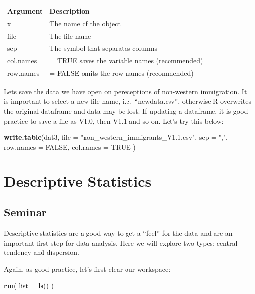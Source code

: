 \documentclass[]{article}
\newenvironment{Shaded}{\begin{snugshade}}{\end{snugshade}}
\newcommand{\DataTypeTok}[1]{\textcolor[rgb]{0.13,0.29,0.53}{#1}}
\newcommand{\KeywordTok}[1]{\textcolor[rgb]{0.13,0.29,0.53}{\textbf{#1}}}
\newcommand{\NormalTok}[1]{#1}
\newcommand{\OtherTok}[1]{\textcolor[rgb]{0.56,0.35,0.01}{#1}}
\newcommand{\StringTok}[1]{\textcolor[rgb]{0.31,0.60,0.02}{#1}}
\begin{document}
\begin{longtable}[]{@{}ll@{}}
\toprule
Argument & Description\tabularnewline
\midrule
\endhead
x & The name of the object\tabularnewline
file & The file name\tabularnewline
sep & The symbol that separates columns\tabularnewline
col.names & = TRUE saves the variable names (recommended)\tabularnewline
row.names & = FALSE omits the row names (recommended)\tabularnewline
\bottomrule
\end{longtable}

Lets save the data we have open on pereceptions of non-western immigration. It is important to select a new file name, i.e.~``newdata.csv'', otherwise R overwrites the original dataframe and data may be lost. If updating a dataframe, it is good practice to save a file as V1.0, then V1.1 and so on. Let's try this below:

\begin{Shaded}
\begin{Highlighting}[]
\KeywordTok{write.table}\NormalTok{(dat3, }
            \DataTypeTok{file =} \StringTok{"non_western_immigrants_V1.1.csv"}\NormalTok{,}
            \DataTypeTok{sep =} \StringTok{","}\NormalTok{,}
            \DataTypeTok{row.names =} \OtherTok{FALSE}\NormalTok{,}
            \DataTypeTok{col.names =} \OtherTok{TRUE}
\NormalTok{)}
\end{Highlighting}
\end{Shaded}

\hypertarget{descriptive-statistics}{%
\section{Descriptive Statistics}\label{descriptive-statistics}}

\hypertarget{seminar-3}{%
\subsection{Seminar}\label{seminar-3}}

Descriptive statistics are a good way to get a ``feel'' for the data and are an important first step for data analysis. Here we will explore two types: central tendency and dispersion.

Again, as good practice, let's first clear our workspace:

\begin{Shaded}
\begin{Highlighting}[]
\KeywordTok{rm}\NormalTok{( }\DataTypeTok{list =} \KeywordTok{ls}\NormalTok{() )}
\end{Highlighting}
\end{Shaded}
\end{document}
